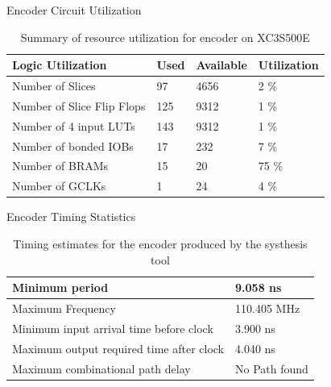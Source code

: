 \documentclass[10pt, compress]{beamer}
\begin{document}
\begin{frame}{Encoder Circuit Utilization}

    \begin{table}[h]
\begin{tabular}{llll}
\toprule
Logic Utilization          & Used & Available & Utilization \\ 
\midrule
Number of Slices           & 97   & 4656      & 2 \%        \\ 
Number of Slice Flip Flops & 125  & 9312      & 1 \%        \\ 
Number of 4 input LUTs     & 143  & 9312      & 1 \%        \\ 
Number of bonded IOBs      & 17   & 232       & 7 \%        \\ 
Number of BRAMs            & 15   & 20        & 75 \%       \\ 
Number of GCLKs            & 1    & 24        & 4 \%        \\ 
\bottomrule
\end{tabular}
\caption{Summary of resource utilization for encoder on XC3S500E}
\end{table}

\end{frame}


\begin{frame}{Encoder Timing Statistics}

\begin{table}[h]
\begin{tabular}{|l|l|}
\hline
Minimum period                           & 9.058 ns      \\ \hline
Maximum Frequency                        & 110.405 MHz   \\ \hline
Minimum input arrival time before clock  & 3.900 ns      \\ \hline
Maximum output required time after clock & 4.040 ns      \\ \hline
Maximum combinational path delay         & No Path found \\ 
\hline
\end{tabular}
\caption{Timing estimates for the encoder produced by the systhesis tool}
\end{table}
    

\end{frame}
\end{document}

